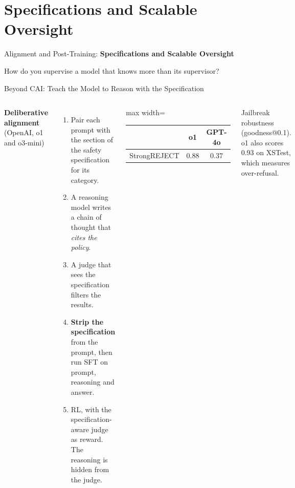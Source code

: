 \section{Specifications and Scalable Oversight}

\begin{frame}{}
    \LARGE Alignment and Post-Training: \textbf{Specifications and Scalable Oversight}

    \vspace{1em}
    \normalsize How do you supervise a model that knows more than its supervisor?
\end{frame}

\begin{frame}{Beyond CAI: Teach the Model to Reason with the Specification}
    \begin{columns}[T,onlytextwidth]
        \textbf{Deliberative alignment} (OpenAI, o1 and o3-mini)
        \begin{enumerate}\itemsep0.3em
            \item Pair each prompt with the section of the safety specification for its category.
            \item A reasoning model writes a chain of thought that \emph{cites the policy}.
            \item A judge that sees the specification filters the results.
            \item \textbf{Strip the specification} from the prompt, then run SFT on prompt, reasoning and answer.
            \item RL, with the specification-aware judge as reward. The reasoning is hidden from the judge.
        \end{enumerate}
        \centering
        \small
        \begin{adjustbox}{max width=\linewidth}\begin{tabular}{lcc}
            \toprule
            & \textbf{o1} & \textbf{GPT-4o} \\
            \midrule
            StrongREJECT & 0.88 & 0.37 \\
            \bottomrule
        \end{tabular}\end{adjustbox}

        \vspace{0.3em}
        {\scriptsize Jailbreak robustness (goodness@0.1). o1 also scores 0.93 on XSTest, which measures over-refusal.}


\end{columns}
\end{frame}
